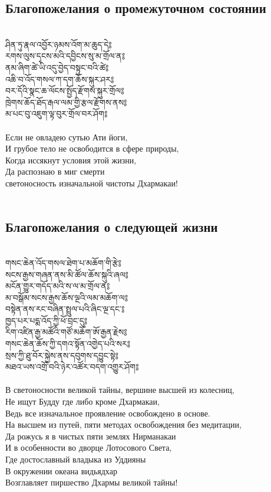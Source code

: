 \subsection{Благопожелания о промежуточном состоянии}
\\
\ti
ཤིན་ཏུ་རྣལ་འབྱོར་ཉམས་འོག་མ་ཆུད་དེ༔\\
རགས་ལུས་དྭངས་མའི་དབྱིངས་སུ་མ་གྲོལ་ན༔\\
ནམ་ཞིག་ཚེ་ཡི་འདུ་བྱེད་བསྟུང་བའི་ཚེ༔\\
འཆི་བ་འོད་གསལ་ཀ་དག་ཆོས་སྐུར་ཤར༔\\
བར་དོའི་སྣང་ཆ་ལོངས་སྤྱོད་རྫོགས་སྐུར་གྲོལ༔\\
ཁྲེགས་ཆོད་ཐོད་རྒལ་ལམ་གྱི་རྩལ་རྫོགས་ནས༔\\
མ་པང་བུ་འཇུག་ལྟ་བུར་གྲོལ་བར་ཤོག༔\\
\\
\ru
Если не овладею сутью Ати йоги,\\
И грубое тело не освободится в сфере природы,\\
Когда иссякнут условия этой жизни,\\
Да распознаю в миг смерти\\
светоносность изначальной чистоты Дхармакаи!\\
\\
\newpage
\subsection{Благопожелания о следующей жизни}
\\
\ti
གསང་ཆེན་འོད་གསལ་ཐེག་པ་མཆོག་གི་རྩེ༔\\
སངས་རྒྱས་གཞན་ནས་མི་ཚོལ་ཆོས་སྐུའི་ཞལ༔\\
མངོན་གྱུར་གདོད་མའི་ས་ལ་མ་གྲོལ་ན༔\\
མ་བསྒོམ་སངས་རྒྱས་ཆོས་ལྔའི་ལམ་མཆོག་ལ༔\\
བསྟེན་ནས་རང་བཞིན་སྤྲུལ་པའི་ཞིང་ལྔ་དང་༔\\
ཁྱད་པར་པདྨ་འོད་ཀྱི་ཕོ་བྲང་དུ༔\\
རིག་འཛིན་རྒྱ་མཚོའི་གཙོ་མཆོག་ཨོ་རྒྱན་རྗེས༔\\
གསང་ཆེན་ཆོས་ཀྱི་དགའ་སྟོན་འགྱེད་པའི་སར༔\\
སྲས་ཀྱི་ཐུ་བོར་སྐྱེས་ནས་དབུགས་དབྱུང་སྟེ༔\\
མཐའ་ཡས་འགྲོ་བའི་ཉེར་འཚོར་བདག་འགྱུར་ཤོག༔\\
\\
\ru
В светоносности великой тайны, вершине высшей из колесниц,\\
Не ищут Будду где либо кроме Дхармакаи,\\
Ведь все изначальное проявление освобождено в основе.\\
На высшем из путей, пяти методах освобождения без медитации,\\
Да рожусь я в чистых пяти землях Нирманакаи\\
И в особенности во дворце Лотосового Света,\\
Где достославный владыка из Уддияны\\
В окружении океана видьядхар\\
Возглавляет пиршество Дхармы великой тайны!\\
\\
\newpage

